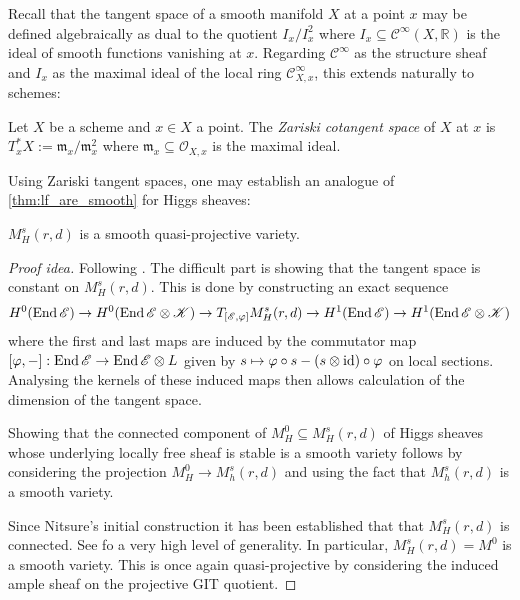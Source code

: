 \documentclass[12pt]{ociamthesis}  %
\begin{document}
Recall that the tangent space of a smooth manifold $X$ at a point $x$ may be
defined algebraically as dual to the quotient $I_x/I_x^2$ where
$I_x\subseteq\mathscr C^\infty(X,\mathbb R)$ is the ideal of smooth
functions vanishing at $x$. Regarding $\mathscr C^\infty$ as the
structure sheaf and $I_x$ as the maximal ideal of the local ring
$\mathscr C^\infty_{X,x}$, this extends naturally to schemes:

\begin{definition}
  Let $X$ be a scheme and $x\in X$ a point. The \emph{Zariski cotangent
    space} of $X$ at $x$ is $T_x^* X := \mathfrak m_x /\mathfrak m_x^2$
  where $\mathfrak m_x\subseteq\mathscr O_{X,x}$ is the maximal ideal.
\end{definition}

Using Zariski tangent spaces, one may establish an analogue of
\ref{thm:lf_are_smooth} for Higgs sheaves:

\begin{theorem}
  $M^s_H(r,d)$ is a smooth quasi-projective variety.
  \begin{proof}[Proof idea]
    Following \cite[296-298]{nitsure1991}. The difficult part is
    showing that the tangent space is constant on $M^s_H(r,d)$. This is
    done by constructing an exact sequence
    \begin{align*}
      H^0(\operatorname{End}\mathscr E)
      \to H^0(\operatorname{End}\mathscr E\otimes\mathscr K)
      \to T_{[\mathscr E,\varphi]}M^s_H(r,d)
      \to H^1(\operatorname{End}\mathscr E)
      \to H^1(\operatorname{End}\mathscr E\otimes\mathscr K)
    \end{align*}
    where the first and last maps are induced by the commutator map
    $[\varphi, -] : \operatorname{End}\mathscr E \to \operatorname{End}\mathscr E \otimes L$
    given by $s \mapsto \varphi\circ s - (s\otimes\operatorname{id})\circ\varphi$
    on local sections. Analysing the kernels of these induced
    maps then allows calculation of the dimension of the tangent
    space.

    Showing that the connected component of $M^0_H\subseteq M^s_H(r,d)$ of
    Higgs sheaves whose underlying locally free sheaf is stable is
    a smooth variety follows by considering the projection $M^0_H\to M^s_h(r,d)$
    and using the fact that $M^s_h(r,d)$ is a smooth variety.

    Since Nitsure's initial construction it has been established that
    that $M^s_H(r,d)$ is connected. See \cite{gpo2016} fo a very
    high level of generality. In particular, $M^s_H(r,d) = M^0$ is
    a smooth variety. This is once again quasi-projective by
    considering the induced ample sheaf on the projective GIT
    quotient.
  \end{proof}
\end{theorem}
\end{document}
